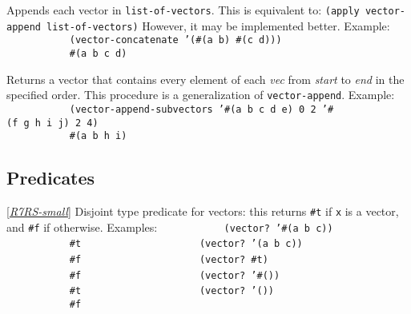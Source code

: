 \begin{entry}{%
  }

   Appends each vector in \texttt{list-of-vectors}. This is
  equivalent to: \texttt{(apply vector-append list-of-vectors)}
  However, it may be implemented better.  Example:
  \texttt{\ \ \ \ \ \ \ \ \ \ \ (vector-concatenate\ '(\#(a\ b)\ \#(c\ d)))\ \ \ \ \ \ \ \ \ }\\
  \texttt{\ \ \ \ \ \ \ \ \ \ \ \#(a\ b\ c\ d)\ \ \ \ \ \ \ \ \ }
\end{entry}
 
\begin{entry}{%
  }


  Returns a vector that contains every element of each \emph{vec} from
  \emph{start} to \emph{end} in the specified order. This procedure is
  a generalization of \texttt{vector-append}.  Example:
  \texttt{\ \ \ \ \ \ \ \ \ \ \ (vector-append-subvectors\ '\#(a\ b\ c\ d\ e)\ 0\ 2\ '\#(f\ g\ h\ i\ j)\ 2\ 4)\ \ \ \ \ \ \ \ \ }\\
  \texttt{\ \ \ \ \ \ \ \ \ \ \ \#(a\ b\ h\ i)\ \ \ \ \ \ \ \ \ }
\end{entry}

\subsection{{Predicates}}


\begin{entry}{%
  }

  {[}\protect\hyperlink{R7RS-small}{\emph{R7RS-small}}{]} Disjoint
  type predicate for vectors: this returns \texttt{\#t} if \texttt{x}
  is a vector, and \texttt{\#f} if otherwise.  Examples:
  \texttt{~~~~~~~~~~~(vector?~'\#(a~b~c))~~~~~~~~~}\\
  \texttt{~~~~~~~~~~~\#t~~~~~~~~~}
  \texttt{~~~~~~~~~~~(vector?~'(a~b~c))~~~~~~~~~}\\
  \texttt{~~~~~~~~~~~\#f~~~~~~~~~}
  \texttt{~~~~~~~~~~~(vector?~\#t)~~~~~~~~~}\\
  \texttt{~~~~~~~~~~~\#f~~~~~~~~~}
  \texttt{~~~~~~~~~~~(vector?~'\#())~~~~~~~~~}\\
  \texttt{~~~~~~~~~~~\#t~~~~~~~~~}
  \texttt{~~~~~~~~~~~(vector?~'())~~~~~~~~~}\\
  \texttt{~~~~~~~~~~~\#f~~~~~~~~~}
\end{entry}

